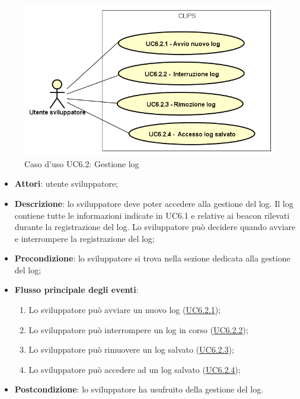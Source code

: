\documentclass[../AnalisiDeiRequisiti.tex]{subfiles}
\begin{document}
\begin{figure}[H]
	\centering
	\includegraphics[scale=0.95, width=\textwidth]{img/UC6-2.png}
	\caption{Caso d'uso UC6.2: Gestione log}\label{fig:UC6.2} 
\end{figure}
\begin{itemize}
	\item \textbf{Attori}: utente sviluppatore;
	\item \textbf{Descrizione}: lo sviluppatore deve poter accedere alla gestione del log. Il log contiene tutte le informazioni indicate in UC6.1 e relative ai beacon rilevati durante la registrazione del log. Lo sviluppatore può decidere quando avviare e interrompere la registrazione del log; 
	\item \textbf{Precondizione}: lo sviluppatore si trova nella sezione dedicata alla gestione del log;
	
	\item \textbf{Flusso principale degli eventi}:
	\begin{enumerate}
		\item Lo sviluppatore può avviare un nuovo log (\hyperlink{UC6.2.1}{UC6.2.1});
		\item Lo sviluppatore può interrompere un log in corso (\hyperlink{UC6.2.2}{UC6.2.2});
		\item Lo sviluppatore può rimuovere un log salvato (\hyperlink{UC6.2.3}{UC6.2.3});
		\item Lo sviluppatore può accedere ad un log salvato (\hyperlink{UC6.2.4}{UC6.2.4});
		
	\end{enumerate}
	\item \textbf{Postcondizione}: lo sviluppatore ha usufruito della gestione del log.
\end{itemize}
\hypertarget{UC6.2.1}{}
\end{document}
